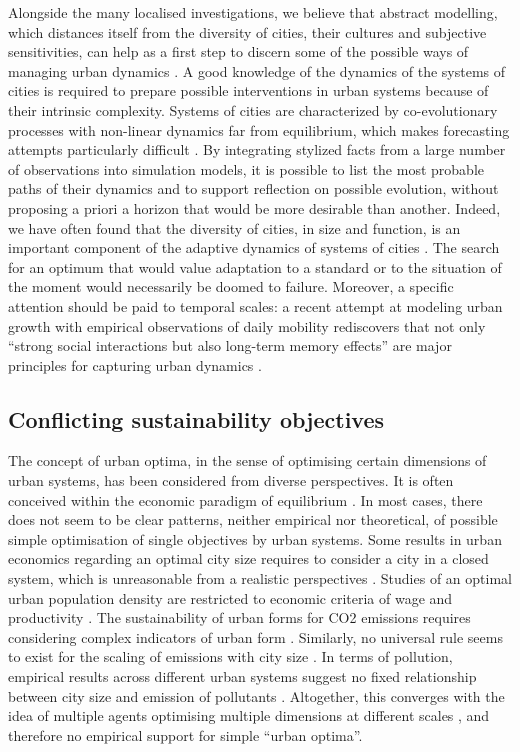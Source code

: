 \documentclass[final,5p,times,twocolumn,authoryear]{elsarticle}
\begin{document}
Alongside the many localised investigations, we believe that abstract modelling, which distances itself from the diversity of cities, their cultures and subjective sensitivities, can help as a first step to discern some of the possible ways of managing urban dynamics \citep{pumain2017urban}. A good knowledge of the dynamics of the systems of cities is required to prepare possible interventions in urban systems because of their intrinsic complexity\citep{reggiani2021reflections}. Systems of cities are characterized by co-evolutionary processes with non-linear dynamics far from equilibrium, which makes forecasting attempts particularly difficult \citep{raimbault2020unveiling}. By integrating stylized facts from a large number of observations into simulation models, it is possible to list the most probable paths of their dynamics and to support reflection on possible evolution, without proposing a priori a horizon that would be more desirable than another. Indeed, we have often found that the diversity of cities, in size and function, is an important component of the adaptive dynamics of systems of cities \citep{pumain2021co}. The search for an optimum that would value adaptation to a standard or to the situation of the moment would necessarily be doomed to failure. Moreover, a specific attention should be paid to temporal scales: a recent attempt at modeling urban growth with empirical observations of daily mobility rediscovers that not only ``strong social interactions but also long-term memory effects'' are major principles for capturing urban dynamics \citep{xu2021emergence}.

\subsection{Conflicting sustainability objectives}

The concept of urban optima, in the sense of optimising certain dimensions of urban systems, has been considered from diverse perspectives. It is often conceived within the economic paradigm of equilibrium \citep{glaeser2008cities}. In most cases, there does not seem to be clear patterns, neither empirical nor theoretical, of possible simple optimisation of single objectives by urban systems. Some results in urban economics regarding an optimal city size requires to consider a city in a closed system, which is unreasonable from a realistic perspectives \citep{singell1974optimum}. Studies of an optimal urban population density are restricted to economic criteria of wage and productivity \citep{su2017density}. The sustainability of urban forms for CO2 emissions requires considering complex indicators of urban form \citep{le2012urban}. Similarly, no universal rule seems to exist for the scaling of emissions with city size \citep{gudipudi2019urban}. In terms of pollution, empirical results across different urban systems suggest no fixed relationship between city size and emission of pollutants \citep{han2016optimum}. Altogether, this converges with the idea of multiple agents optimising multiple dimensions at different scales \citep{pumain2008socio}, and therefore no empirical support for simple ``urban optima''.
\end{document}
